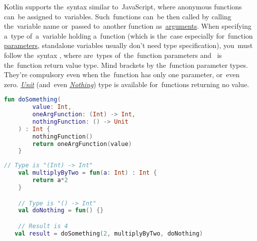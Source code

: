 \label{kotlinanonymousfunction}
Kotlin supports the~syntax similar to~JavaScript, where anonymous functions can~be assigned to~variables.
Such~functions can~be then called by calling the~variable name or~passed to~another function as~\hyperref[parameterargument]{arguments}.
When specifying a~type of~a~variable holding a~function (which is the~case especially for~function \hyperref[parameterargument]{parameters}, standalone variables usually don't need type specification), you~must follow the~syntax , where  are~types of~the~function parameters \mbox{and } is the~function return value type.
Mind brackets by the~function parameter types.
They're compulsory even when the~function has only one parameter, or~even zero.
\hyperref[kotlinunit]{\textit{Unit}} (and~even \hyperref[kotlinnothing]{\textit{Nothing}}) type is available for~functions returning no value.

\example
\enlargethispage{10mm}
\thispagestyle{empty}
\begin{lstlisting}[language=Kotlin, title={Function taking other functions as parameters}]
    fun doSomething(
        value: Int,
        oneArgFunction: (Int) -> Int,
        nothingFunction: () -> Unit
    ) : Int {
        nothingFunction()
        return oneArgFunction(value)
    }
\end{lstlisting}
\newpage

\begin{lstlisting}[language=Kotlin, title={Usage}]
    // Type is "(Int) -> Int"
    val multiplyByTwo = fun(a: Int) : Int {
        return a*2
    }

    // Type is "() -> Int"
    val doNothing = fun() {}

    // Result is 4
   val result = doSomething(2, multiplyByTwo, doNothing)
\end{lstlisting}
